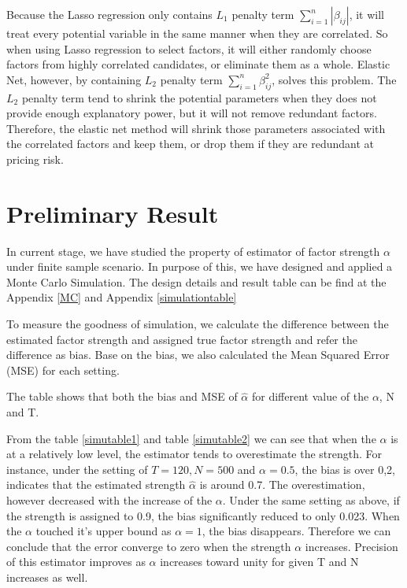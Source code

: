 \documentclass[12pt]{article}
\begin{document}
	
	
Because the Lasso regression only contains $L_1$ penalty term $\sum_{i = 1}^{n} |\beta_{ij}|$, it will treat every potential variable in the same manner when they are correlated. 
So when using Lasso regression to select factors, it will either randomly choose factors from highly correlated candidates, or eliminate them as a whole.  
Elastic Net, however, by containing $L_2$ penalty term $\sum_{i=1}^{n}\beta_{ij}^2$, solves this problem. 
The $L_2$ penalty term tend to shrink the potential parameters when they does not provide enough explanatory power, but it will not remove redundant factors.
Therefore, the elastic net method will shrink those parameters associated with the correlated factors and keep them, or drop them if they are redundant at pricing risk. 
	


\section{Preliminary Result}
In current stage, we have studied the property of estimator of factor strength $\alpha$ under finite sample scenario.
In purpose of this, we have designed and applied a Monte Carlo Simulation.
The design details and result table can be find at the Appendix \ref{MC} and Appendix \ref{simulationtable} 

To measure the goodness of simulation, we calculate the difference between the estimated factor strength and assigned true factor strength and refer the difference as bias.
Base on the bias, we also calculated the Mean Squared Error (MSE) for each setting.

The table shows that both the bias and MSE of $\hat{\alpha}$ for different value of the $\alpha$, N and T.

From the table \ref{simutable1} and table \ref{simutable2} we can see that when the $\alpha$ is at a relatively low level, the estimator  tends to overestimate the strength.
For instance, under the  setting of $T = 120, N = 500$ and $\alpha = 0.5$, the bias is over 0,2, indicates that the estimated strength $\hat{\alpha}$ is around 0.7.
The overestimation, however decreased with the increase of the $\alpha$.
Under the same setting as above, if the strength is assigned to 0.9, the bias significantly reduced to only 0.023.
When the $\alpha$ touched it's upper bound as $\alpha = 1$, the bias disappears.
Therefore we can conclude that the error converge to zero when the strength $\alpha$ increases. 
Precision of this estimator improves as $\alpha$ increases toward unity for given T and N increases as well.
\end{document}
